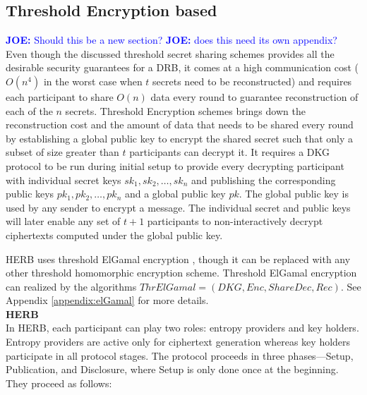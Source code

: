\documentclass[letterpaper,twocolumn,10pt]{article}
\theoremstyle{definition}
\theoremstyle{remark}
\newcommand{\joenote}[1]{\textcolor{blue}{\textbf{JOE:} #1}}
\begin{document}
\subsection{Threshold Encryption based}
\joenote{Should this be a new section?}
\joenote{does this need its own appendix?}
 Even though the discussed threshold secret sharing schemes provides all the desirable security guarantees for a DRB, it comes at a high communication cost ($O(n^4)$ in the worst case when $t$ secrets need to be reconstructed) and requires each participant to share $O(n)$ data every round to guarantee reconstruction of each of the $n$ secrets. Threshold Encryption schemes brings down the reconstruction cost and the amount of data that needs to be shared every round by establishing a global public key to encrypt the shared secret such that only a subset of size greater than $t$ participants can decrypt it. It requires a DKG protocol to be run during initial setup to provide every decrypting participant with individual secret keys $sk_1, sk_2, \ldots, sk_n$ and publishing the corresponding public keys $pk_1, pk_2, \ldots, pk_n$ and a global public key $pk$. The global public key is used by any sender to encrypt a message. The individual secret and public keys will later enable any set of $t + 1$ participants to non-interactively decrypt ciphertexts computed under the global public key.
 
 HERB \cite{cherniaeva2019homomorphic} uses threshold ElGamal encryption \cite{desmedt1990Threshold}, though it can be replaced with any other threshold homomorphic encryption scheme. Threshold ElGamal encryption can realized by the algorithms $ThrElGamal = (DKG, Enc, ShareDec, Rec)$. See Appendix \ref{appendix:elGamal} for more details. \\
 
\textbf{HERB}\\

In HERB, each participant can play two roles: entropy providers and key holders. Entropy providers are active only for ciphertext generation whereas key holders participate in all protocol stages. The protocol proceeds in three phases---Setup, Publication, and Disclosure, where Setup is only done once at the beginning. They proceed as follows:
\end{document}
